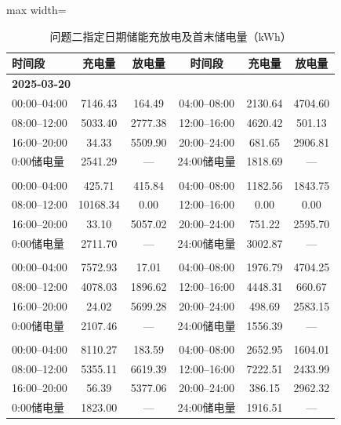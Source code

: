 \documentclass[UTF8,a4paper,zihao=-4,fontset=windows]{ctexart}
\newcommand{\figtabnote}[1]{\par\vspace{3pt}{\fontsize{9}{11}\selectfont\raggedright\noindent 注：#1\par}}
\begin{document}
\begin{table}[H]\centering
\fontsize{9.5}{12}\selectfont\setlength{\tabcolsep}{4pt}\renewcommand{\arraystretch}{1.12}
\begin{adjustbox}{max width=\linewidth}\begin{tabular}{lccccc}\toprule
\textbf{时间段} & \textbf{充电量} & \textbf{放电量} & \textbf{时间段} & \textbf{充电量} & \textbf{放电量}\\
\midrule
\multicolumn{6}{l}{\textbf{2025-03-20}}\\[1pt]
00:00–04:00 & 7146.43 & 164.49 & 04:00–08:00 & 2130.64 & 4704.60\\
08:00–12:00 & 5033.40 & 2777.38 & 12:00–16:00 & 4620.42 & 501.13\\
16:00–20:00 & 34.33 & 5509.90 & 20:00–24:00 & 681.65 & 2906.81\\
0:00储电量 & 2541.29 & — & 24:00储电量 & 1818.69 & —\\
\addlinespace[4pt]
\multicolumn{6}{l}{\textbf{2025-06-21}}\\[1pt]
00:00–04:00 & 425.71 & 415.84 & 04:00–08:00 & 1182.56 & 1843.75\\
08:00–12:00 & 10168.34 & 0.00 & 12:00–16:00 & 0.00 & 0.00\\
16:00–20:00 & 33.10 & 5057.02 & 20:00–24:00 & 751.22 & 2595.70\\
0:00储电量 & 2711.70 & — & 24:00储电量 & 3002.87 & —\\
\addlinespace[4pt]
\multicolumn{6}{l}{\textbf{2025-09-23}}\\[1pt]
00:00–04:00 & 7572.93 & 17.01 & 04:00–08:00 & 1976.79 & 4704.25\\
08:00–12:00 & 4078.03 & 1896.62 & 12:00–16:00 & 4448.31 & 660.67\\
16:00–20:00 & 24.02 & 5699.28 & 20:00–24:00 & 498.69 & 2583.15\\
0:00储电量 & 2107.46 & — & 24:00储电量 & 1556.39 & —\\
\addlinespace[4pt]
\multicolumn{6}{l}{\textbf{2025-12-21}}\\[1pt]
00:00–04:00 & 8110.27 & 183.59 & 04:00–08:00 & 2652.95 & 1604.01\\
08:00–12:00 & 5355.11 & 6619.39 & 12:00–16:00 & 7222.51 & 2433.99\\
16:00–20:00 & 56.39 & 5377.06 & 20:00–24:00 & 386.15 & 2962.32\\
0:00储电量 & 1823.00 & — & 24:00储电量 & 1916.51 & —\\
\bottomrule\end{tabular}\end{adjustbox}
\caption{问题二指定日期储能充放电及首末储电量（kWh）}
\figtabnote{各日期沿用题面表2的列次。}
\end{table}
\end{document}
